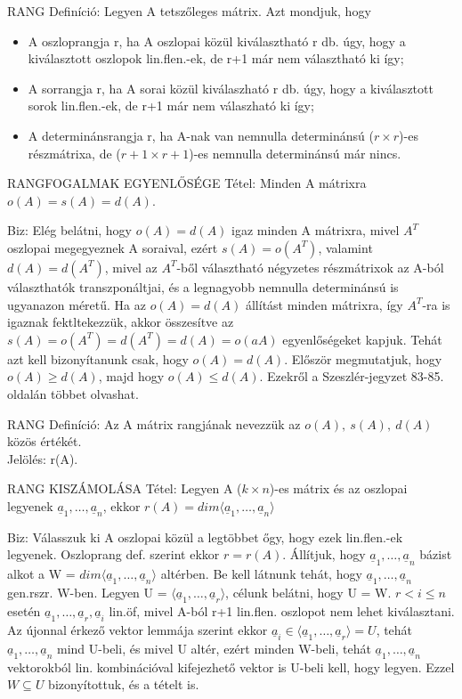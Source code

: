 \documentclass[]{article}
\newcommand{\Und}[1]{\underline{#1}}
\begin{document}
\begin{shaded}
RANG Definíció: Legyen A tetszőleges mátrix. Azt mondjuk, hogy
\begin{itemize}
\item A oszloprangja r, ha A oszlopai közül kiválasztható r db. úgy, hogy a kiválasztott oszlopok lin.flen.-ek, de r+1 már nem választható ki így;
\item A sorrangja r, ha A sorai közül kiválaszható r db. úgy, hogy a kiválasztott sorok lin.flen.-ek, de r+1 már nem válaszható ki így;
\item A determinánsrangja r, ha A-nak van nemnulla determinánsú ($r \times r$)-es részmátrixa, de ($r+1 \times r+1$)-es nemnulla determinánsú már nincs.
\end{itemize}
\end{shaded}
\begin{framed}
RANGFOGALMAK EGYENLŐSÉGE Tétel: Minden A mátrixra $o(A) = s(A) = d(A)$.
\end{framed}
\begin{leftbar}
Biz: Elég belátni, hogy $o(A) = d(A)$ igaz minden A mátrixra, mivel $A^T$ oszlopai megegyeznek A soraival, ezért $s(A) = o(A^T)$, valamint $d(A) = d(A^T)$, mivel az $A^T$-ből választható négyzetes részmátrixok az A-ból választhatók transzponáltjai, és a legnagyobb nemnulla determinánsú is ugyanazon méretű. Ha az $o(A) = d(A)$ állítást minden mátrixra, így $A^T$-ra is igaznak fektltekezzük, akkor összesítve az $s(A) = o(A^T) = d(A^T) = d(A) = o(aA)$ egyenlőségeket kapjuk. Tehát azt kell bizonyítanunk csak, hogy $o(A) = d(A)$. Először megmutatjuk, hogy $o(A) \geq d(A)$, majd hogy $o(A) \leq d(A)$. Ezekről a Szeszlér-jegyzet 83-85. oldalán többet olvashat.
\end{leftbar}
\begin{shaded}
RANG Definíció: Az A mátrix rangjának nevezzük az $o(A),\: s(A),\: d(A)$ közös értékét.\\
Jelölés: r(A).
\end{shaded}
\begin{framed}
RANG KISZÁMOLÁSA Tétel: Legyen A ($k \times n$)-es mátrix és az oszlopai legyenek $\Und{a}_1, \ldots, \Und{a}_n$, ekkor $r(A) = dim\langle\Und{a}_1, \ldots, \Und{a}_n\rangle$
\end{framed}
\begin{leftbar}
Biz: Válasszuk ki A oszlopai közül a legtöbbet őgy, hogy ezek lin.flen.-ek legyenek. Oszloprang def. szerint ekkor $r = r(A)$. Állítjuk, hogy $\Und{a}_1, \ldots, \Und{a}_n$ bázist alkot a W = $dim\langle\Und{a}_1, \ldots, \Und{a}_n\rangle$ altérben. Be kell látnunk tehát, hogy $\Und{a}_1, \ldots, \Und{a}_n$ gen.rszr. W-ben. Legyen U = $\langle\Und{a}_1, \ldots, \Und{a}_r\rangle$, célunk belátni, hogy U = W. $r < i \leq n$ esetén $\Und{a}_1, \ldots, \Und{a}_r, \Und{a}_i$ lin.öf, mivel A-ból r+1 lin.flen. oszlopot nem lehet kiválasztani. Az újonnal érkező vektor lemmája szerint ekkor $\Und{a}_i\in\langle\Und{a}_1, \ldots, \Und{a}_r\rangle = U$, tehát $\Und{a}_1, \ldots, \Und{a}_n$ mind U-beli, és mivel U altér, ezért minden W-beli, tehát $\Und{a}_1, \ldots, \Und{a}_n$ vektorokból lin. kombinációval kifejezhető vektor is U-beli kell, hogy legyen. Ezzel $W \subseteq U$ bizonyítottuk, és a tételt is.
\end{leftbar}
\end{document}
